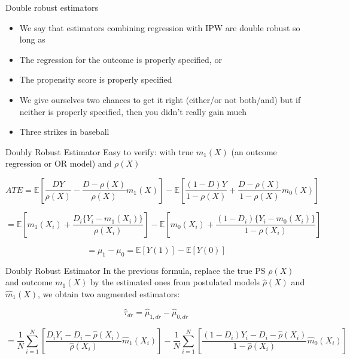 \documentclass{beamer}
\begin{document}
\begin{frame}{Double robust estimators}

\begin{itemize}
\item We say that estimators combining regression with IPW are double robust so long as
	\item The regression for the outcome is properly specified, or
	\item The propensity score is properly specified
\item We give ourselves two chances to get it right (either/or not both/and) but if neither is properly specified, then you didn't really gain much
\item Three strikes in baseball
\end{itemize}

\end{frame}

\begin{frame}{Doubly Robust Estimator}
    Easy to verify: with true \( m_1(X) \) (an outcome regression or OR model) and \( \rho(X) \)
\footnotesize

    \[
    ATE = \mathbb{E} \left[ \frac{DY}{\rho(X)} - \frac{D - \rho(X)}{\rho(X)}m_1(X) \right]
    - \mathbb{E} \left[ \frac{(1 - D)Y}{1 - \rho(X)} + \frac{D - \rho(X)}{1 - \rho(X)}m_0(X) \right]
    \]

    \[
    = \mathbb{E} \left[ m_1(X_i) + \frac{D_i\{Y_i - m_1(X_i)\}}{\rho(X_i)} \right]
    - \mathbb{E} \left[ m_0(X_i) + \frac{(1 - D_i)\{Y_i - m_0(X_i)\}}{1 - \rho(X_i)} \right]
    \]

    \[
    = \mu_1 - \mu_0 = \mathbb{E}[Y(1)] - \mathbb{E}[Y(0)]
    \]
\end{frame}

\begin{frame}{Doubly Robust Estimator}
    In the previous formula, replace the true PS \( \rho(X) \) and outcome
    \( m_1(X) \) by the estimated ones from postulated models \( \hat{\rho}(X) \) and
    \( \hat{m}_1(X) \), we obtain two augmented estimators:

    \[
    \widehat{\tau}_{dr} = \hat{\mu}_{1,dr} - \hat{\mu}_{0,dr}
    \]

\footnotesize
    \[
    = \frac{1}{N} \sum_{i=1}^{N} \left[ \frac{D_iY_i - D_i - \hat{\rho}(X_i)}{\hat{\rho}(X_i)} \hat{m}_1(X_i) \right]
    - \frac{1}{N} \sum_{i=1}^{N} \left[ \frac{(1 - D_i)Y_i - D_i - \hat{\rho}(X_i)}{1 - \hat{\rho}(X_i)} \hat{m}_0(X_i) \right]
    \]

\end{frame}
\end{document}
